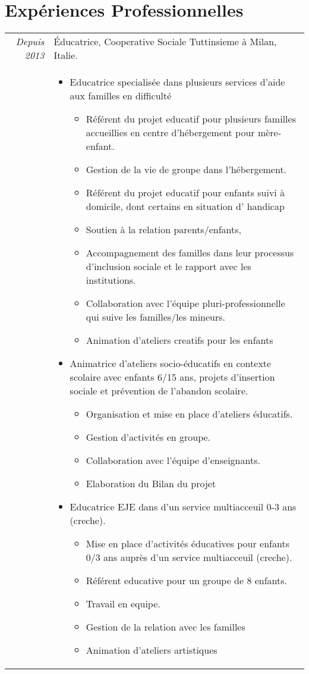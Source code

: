\documentclass[a4paper,10pt]{article}
\begin{document}
\section{Expériences Professionnelles}
\begin{tabular}{r|p{13cm}}
 \emph{Depuis 2013} & Éducatrice, Cooperative Sociale Tuttinsieme à Milan, Italie.\\
 &\footnotesize{
 	\begin{itemize}
 	
 	\item Educatrice specialisée dans plusieurs services d'aide aux familles en difficulté
 		\begin{itemize}
			\item Référent du projet educatif pour plusieurs familles accueillies en centre d'hébergement pour mère-enfant.
			\item Gestion de la vie de groupe dans l'hébergement.
			\item Référent du projet educatif pour enfants suivi à domicile, dont certains en situation d' handicap
			\item Soutien à la relation parents/enfants, 
			\item Accompagnement des familles dans leur processus d'inclusion sociale et le rapport avec les institutions.
			\item Collaboration avec l’équipe pluri-professionnelle qui suive les familles/les mineurs.
			\item Animation d'ateliers creatifs pour les enfants
			
 		\end{itemize}
 	\item Animatrice d’ateliers socio-éducatifs en contexte scolaire avec enfants 6/15 ans, projets
d'insertion sociale et prévention de l'abandon scolaire.
	\begin{itemize}
		\item Organisation et mise en place d’ateliers éducatifs.
		\item Gestion d'activités en groupe.
		\item Collaboration avec l’équipe d'enseignants.
		\item Elaboration du Bilan du projet
	\end{itemize}
	\item Educatrice EJE dans d'un service multiacceuil 0-3 ans (creche).
	\begin{itemize}
		\item Mise en place d'activités éducatives pour enfants 0/3 ans auprès d'un service multiacceuil
(creche).
		\item Référent educative pour un groupe de 8 enfants.
		\item Travail en equipe.
		\item Gestion de la relation avec les familles
		\item Animation d'ateliers artistiques
	\end{itemize}
 	\end{itemize}
 } \\
 

\end{tabular}
\end{document}
